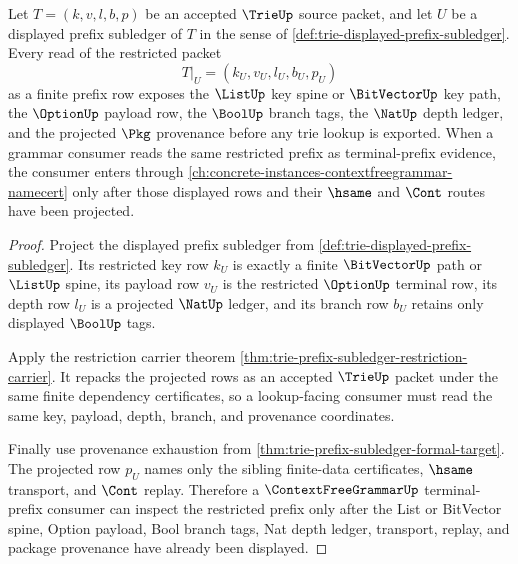 \begin{theorem}
\label{thm:trie-list-prefix-dependency-route}
Let $T=(k,v,l,b,p)$ be an accepted $\TrieUp$ source packet, and let $U$ be a displayed prefix subledger of $T$ in the sense of \autoref{def:trie-displayed-prefix-subledger}. Every read of the restricted packet
$$
T|_U=(k_U,v_U,l_U,b_U,p_U)
$$
as a finite prefix row exposes the $\ListUp$ key spine or $\BitVectorUp$ key path, the $\OptionUp$ payload row, the $\BoolUp$ branch tags, the $\NatUp$ depth ledger, and the projected $\Pkg$ provenance before any trie lookup is exported. When a grammar consumer reads the same restricted prefix as terminal-prefix evidence, the consumer enters through \autoref{ch:concrete-instances-contextfreegrammar-namecert} only after those displayed rows and their $\hsame$ and $\Cont$ routes have been projected.
\end{theorem}
\begin{proof}
Project the displayed prefix subledger from \autoref{def:trie-displayed-prefix-subledger}. Its restricted key row $k_U$ is exactly a finite $\BitVectorUp$ path or $\ListUp$ spine, its payload row $v_U$ is the restricted $\OptionUp$ terminal row, its depth row $l_U$ is a projected $\NatUp$ ledger, and its branch row $b_U$ retains only displayed $\BoolUp$ tags.

Apply the restriction carrier theorem \autoref{thm:trie-prefix-subledger-restriction-carrier}. It repacks the projected rows as an accepted $\TrieUp$ packet under the same finite dependency certificates, so a lookup-facing consumer must read the same key, payload, depth, branch, and provenance coordinates.

Finally use provenance exhaustion from \autoref{thm:trie-prefix-subledger-formal-target}. The projected row $p_U$ names only the sibling finite-data certificates, $\hsame$ transport, and $\Cont$ replay. Therefore a $\ContextFreeGrammarUp$ terminal-prefix consumer can inspect the restricted prefix only after the List or BitVector spine, Option payload, Bool branch tags, Nat depth ledger, transport, replay, and package provenance have already been displayed.
\end{proof}
